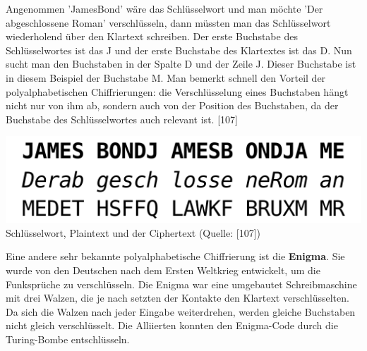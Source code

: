 \documentclass[12pt,a4paper]{report}
\begin{document}
\begin{onehalfspace}
Angenommen 'JamesBond' wäre das Schlüsselwort und man möchte 'Der abgeschlossene Roman' verschlüsseln, dann müssten man das Schlüsselwort wiederholend über den Klartext schreiben. Der erste Buchstabe des Schlüsselwortes ist das J und der erste Buchstabe des Klartextes ist das D. Nun sucht man den Buchstaben in der Spalte D und der Zeile J. Dieser Buchstabe ist in diesem Beispiel der Buchstabe M. Man bemerkt schnell den Vorteil der polyalphabetischen Chiffrierungen: die Verschlüsselung eines Buchstaben hängt nicht nur von ihm ab, sondern auch von der Position des Buchstaben, da der Buchstabe des Schlüsselwortes auch relevant ist. [107]

\begin{center}
\includegraphics[scale=0.5]{img/vingere.png}\\
Schlüsselwort, Plaintext und der Ciphertext (Quelle: [107])
\end{center}

Eine andere sehr bekannte polyalphabetische Chiffrierung ist die \textbf{Enigma}. Sie wurde von den Deutschen nach dem Ersten Weltkrieg entwickelt, um die Funksprüche zu verschlüsseln. Die Enigma war eine umgebautet Schreibmaschine mit drei Walzen, die je nach setzten der Kontakte den Klartext verschlüsselten. Da sich die Walzen nach jeder Eingabe weiterdrehen, werden gleiche Buchstaben nicht gleich verschlüsselt. Die Alliierten konnten den Enigma-Code durch die Turing-Bombe entschlüsseln.


\end{onehalfspace}
\end{document}
